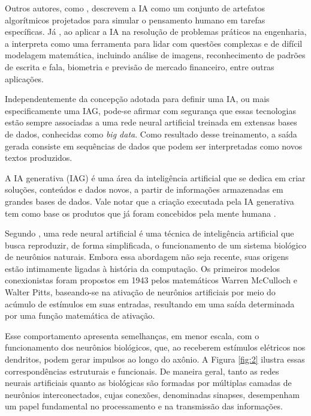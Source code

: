 \documentclass[openany,oneside,a4paper,11pt]{extarticle}
\begin{document}
Outros autores, como \textcite{haykin1999neural}, descrevem a IA como um conjunto de artefatos algorítmicos projetados para simular o pensamento humano em tarefas específicas. Já \textcite{silva2016redes}, ao aplicar a IA na resolução de problemas práticos na engenharia, a interpreta como uma ferramenta para lidar com questões complexas e de difícil modelagem matemática, incluindo análise de imagens, reconhecimento de padrões de escrita e fala, biometria e previsão de mercado financeiro, entre outras aplicações.

Independentemente da concepção adotada para definir uma IA, ou mais especificamente uma IAG, pode-se afirmar com segurança que essas tecnologias estão sempre associadas a uma rede neural artificial treinada em extensas bases de dados, conhecidas como \textit{big data}. Como resultado desse treinamento, a saída gerada consiste em sequências de dados que podem ser interpretadas como novos textos produzidos.

\begin{quoting}[rightmargin=0cm,leftmargin=4cm]
{\footnotesize 
\begin{singlespace}
\noindent
A IA generativa (IAG) é uma área da inteligência artificial que se dedica em criar soluções, conteúdos e dados novos, a partir de informações armazenadas em grandes bases de dados. Vale notar que a criação executada pela IA generativa tem como base os produtos que já foram concebidos pela mente humana \cite[Pág. 121]{hessel2023criatividade}.
\end{singlespace}
}
\end{quoting}

Segundo \textcite{lugerIA_2004}, uma rede neural artificial é uma técnica de inteligência artificial que busca reproduzir, de forma simplificada, o funcionamento de um sistema biológico de neurônios naturais. Embora essa abordagem não seja recente, suas origens estão intimamente ligadas à história da computação. Os primeiros modelos conexionistas foram propostos em 1943 pelos matemáticos Warren McCulloch e Walter Pitts, baseando-se na ativação de neurônios artificiais por meio do acúmulo de estímulos em suas entradas, resultando em uma saída determinada por uma função matemática de ativação.

Esse comportamento apresenta semelhanças, em menor escala, com o funcionamento dos neurônios biológicos, que, ao receberem estímulos elétricos nos dendritos, podem gerar impulsos ao longo do axônio. A Figura \ref{fig:2} ilustra essas correspondências estruturais e funcionais. De maneira geral, tanto as redes neurais artificiais quanto as biológicas são formadas por múltiplas camadas de neurônios interconectados, cujas conexões, denominadas sinapses, desempenham um papel fundamental no processamento e na transmissão das informações.
\end{document}
